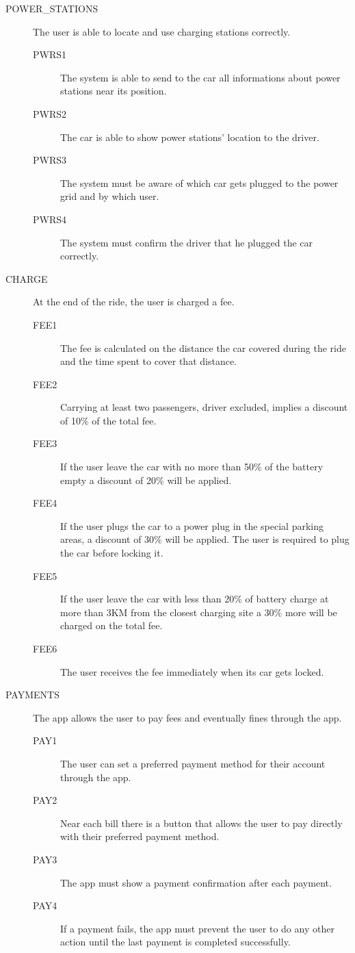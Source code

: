 \documentclass[11pt]{article} %
\begin{document}
\begin{description}
	\item[POWER\_STATIONS] The user is able to locate and use charging stations correctly.
	\begin{description}
	\item[PWRS1] The system is able to send to the car all informations about power stations near its position.
	\item[PWRS2] The car is able to show power stations' location to the driver.
	\item[PWRS3] The system must be aware of which car gets plugged to the power grid and by which user.
	\item[PWRS4] The system must confirm the driver that he plugged the car correctly.
	\end{description}

 	\item[CHARGE] At the end of the ride, the user is charged a fee.
	\begin{description}
	\item[FEE1] The fee is calculated on the distance the car covered during the ride and the time spent to cover that distance.
	\item[FEE2] Carrying at least two passengers, driver excluded, implies a discount of 10\% of the total fee.
	\item[FEE3] If the user leave the car with no more than 50\% of the battery empty a discount of 20\% will be applied.
	\item[FEE4] If the user plugs the car to a power plug in the special parking areas, a discount of 30\% will be applied. The user is required to plug the car before locking it.
	\item[FEE5] If the user leave the car with less than 20\% of battery charge at more than 3KM from the closest charging site a 30\% more will be charged on the total fee.
	\item[FEE6] The user receives the fee immediately when its car gets locked.
	\end{description}

	\item[PAYMENTS] The app allows the user to pay fees and eventually fines through the app.
	\begin{description}	
	\item[PAY1] The user can set a preferred payment method for their account through the app.
	\item[PAY2] Near each bill there is a button that allows the user to pay directly with their preferred payment method.
	\item[PAY3] The app must show a payment confirmation after each payment.
	\item[PAY4] If a payment fails, the app must prevent the user to do any other action until the last payment is completed successfully.
	\end{description}


\end{description}
\end{document}
